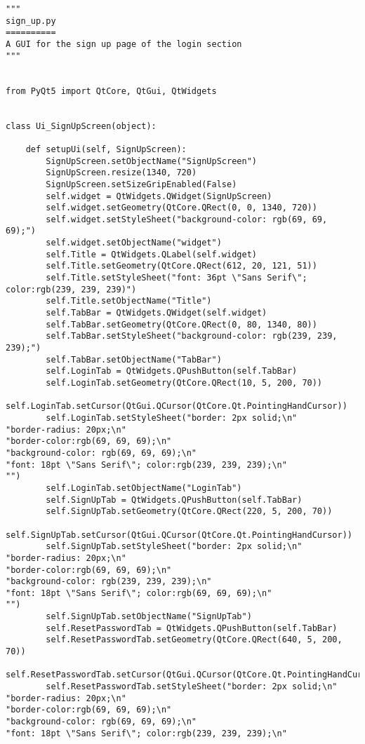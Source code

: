 \documentclass{article}
\begin{document}
\begin{lstlisting}
"""
sign_up.py
==========
A GUI for the sign up page of the login section
"""


from PyQt5 import QtCore, QtGui, QtWidgets


class Ui_SignUpScreen(object):

    def setupUi(self, SignUpScreen):
        SignUpScreen.setObjectName("SignUpScreen")
        SignUpScreen.resize(1340, 720)
        SignUpScreen.setSizeGripEnabled(False)
        self.widget = QtWidgets.QWidget(SignUpScreen)
        self.widget.setGeometry(QtCore.QRect(0, 0, 1340, 720))
        self.widget.setStyleSheet("background-color: rgb(69, 69, 69);")
        self.widget.setObjectName("widget")
        self.Title = QtWidgets.QLabel(self.widget)
        self.Title.setGeometry(QtCore.QRect(612, 20, 121, 51))
        self.Title.setStyleSheet("font: 36pt \"Sans Serif\"; color:rgb(239, 239, 239)")
        self.Title.setObjectName("Title")
        self.TabBar = QtWidgets.QWidget(self.widget)
        self.TabBar.setGeometry(QtCore.QRect(0, 80, 1340, 80))
        self.TabBar.setStyleSheet("background-color: rgb(239, 239, 239);")
        self.TabBar.setObjectName("TabBar")
        self.LoginTab = QtWidgets.QPushButton(self.TabBar)
        self.LoginTab.setGeometry(QtCore.QRect(10, 5, 200, 70))
        self.LoginTab.setCursor(QtGui.QCursor(QtCore.Qt.PointingHandCursor))
        self.LoginTab.setStyleSheet("border: 2px solid;\n"
"border-radius: 20px;\n"
"border-color:rgb(69, 69, 69);\n"
"background-color: rgb(69, 69, 69);\n"
"font: 18pt \"Sans Serif\"; color:rgb(239, 239, 239);\n"
"")
        self.LoginTab.setObjectName("LoginTab")
        self.SignUpTab = QtWidgets.QPushButton(self.TabBar)
        self.SignUpTab.setGeometry(QtCore.QRect(220, 5, 200, 70))
        self.SignUpTab.setCursor(QtGui.QCursor(QtCore.Qt.PointingHandCursor))
        self.SignUpTab.setStyleSheet("border: 2px solid;\n"
"border-radius: 20px;\n"
"border-color:rgb(69, 69, 69);\n"
"background-color: rgb(239, 239, 239);\n"
"font: 18pt \"Sans Serif\"; color:rgb(69, 69, 69);\n"
"")
        self.SignUpTab.setObjectName("SignUpTab")
        self.ResetPasswordTab = QtWidgets.QPushButton(self.TabBar)
        self.ResetPasswordTab.setGeometry(QtCore.QRect(640, 5, 200, 70))
        self.ResetPasswordTab.setCursor(QtGui.QCursor(QtCore.Qt.PointingHandCursor))
        self.ResetPasswordTab.setStyleSheet("border: 2px solid;\n"
"border-radius: 20px;\n"
"border-color:rgb(69, 69, 69);\n"
"background-color: rgb(69, 69, 69);\n"
"font: 18pt \"Sans Serif\"; color:rgb(239, 239, 239);\n"

\end{lstlisting}
\end{document}
